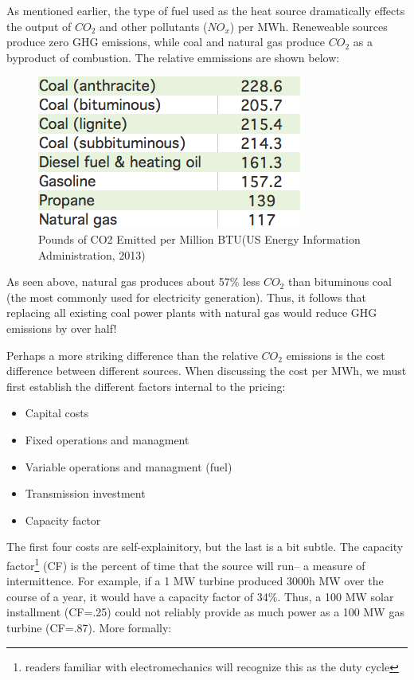 \documentclass{article}
\begin{document}
As mentioned earlier, the type of fuel used as the heat source dramatically effects the output of $CO_2$ and other pollutants ($NO_x$) per MWh. Reneweable sources produce zero GHG emissions, while coal and natural gas produce $CO_2$ as a byproduct of combustion. The relative emmissions are shown below:

\begin{figure}[H]
	\begin{center}
	\includegraphics[scale = .5]{Figures/co2fuel.png}
	\caption{Pounds of CO2 Emitted per Million BTU(US Energy Information Administration, 2013)}
	\end{center}
\end{figure}

As seen above, natural gas produces about 57\% less $CO_2$ than bituminous coal (the most commonly used for electricity generation). Thus, it follows that replacing all existing coal power plants with natural gas would reduce GHG emissions by over half! \*

Perhaps a more striking difference than the relative $CO_2$ emissions is the cost difference between different sources. When discussing the cost per MWh, we must first establish the different factors internal to the pricing:

\begin{itemize}
\item Capital costs 
\item Fixed operations and managment 
\item Variable operations and managment (fuel)
\item Transmission investment
\item Capacity factor
\end{itemize}

The first four costs are self-explainitory, but the last is a bit subtle. The capacity factor\footnote{readers familiar with electromechanics will recognize this as the duty cycle} (CF) is the percent of time that the source will run-- a measure of intermittence. For example, if a 1 MW turbine produced 3000h MW over the course of a year, it would have a capacity factor of 34\%. Thus, a 100 MW solar installment (CF=.25) could not reliably provide as much power as a 100 MW gas turbine (CF=.87). 
More formally:
\end{document}
